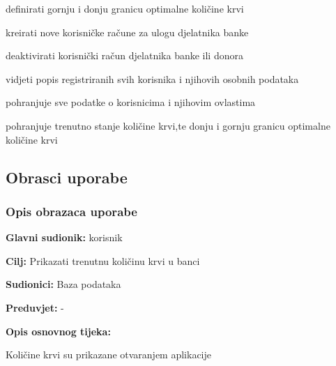 \documentclass[11pt]{book}
\begin{document}
\begin{packed_enum}
\begin{packed_enum}
		\item definirati gornju i donju granicu optimalne količine krvi
		\item kreirati nove korisničke račune za ulogu djelatnika banke
		\item deaktivirati korisnički račun djelatnika banke ili donora
		\item vidjeti popis registriranih svih korisnika i njihovih osobnih podataka
		
	\end{packed_enum}
	
	\item  {}
	
	\begin{packed_enum}
		
		\item pohranjuje sve podatke o korisnicima i njihovim ovlastima
		\item pohranjuje trenutno stanje količine krvi,te donju i gornju granicu optimalne količine krvi
		
	\end{packed_enum}
\end{packed_enum}

\eject 



\subsection{Obrasci uporabe}

\subsubsection{Opis obrazaca uporabe}


\noindent {}
					\begin{packed_item}
	
						\item \textbf{Glavni sudionik: }korisnik
						\item \textbf{Cilj:} Prikazati trenutnu količinu krvi u banci
						\item \textbf{Sudionici:} Baza podataka
						\item \textbf{Preduvjet:} -
						\item \textbf{Opis osnovnog tijeka:}
						
						\item[] \begin{packed_enum}
	
							\item Količine krvi su prikazane otvaranjem aplikacije
							
						\end{packed_enum}

					\end{packed_item}
\end{document}
